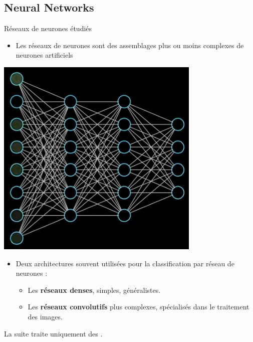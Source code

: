 \documentclass[10pt,serif,mathserif,compress,hyperref={colorlinks}]{beamer}
\begin{document}
\subsection{Neural Networks}

\begin{frame}{Réseaux de neurones étudiés}

  \begin{minipage}{0.6\textwidth}
    \begin{itemize}
    \item Les réseaux de neurones sont des assemblages plus ou moins complexes de neurones artificiels
    \end{itemize}       
  \end{minipage}\begin{minipage}{0.4\textwidth}    
    \includegraphics[width=.9\textwidth]{images/RN.png}
  \end{minipage}    
  
  \begin{itemize}
  \item Deux architectures souvent utilisées pour la classification par réseau de neurones :
  \begin{itemize}
  \item Les \textbf{réseaux denses}, simples, généralistes.
  \item Les \textbf{réseaux convolutifs} plus complexes,  spécialisés dans le traitement des images.
  \end{itemize}
  
  \end{itemize}       

  \bigskip
    La suite traite uniquement des .
  
\end{frame}
\end{document}
